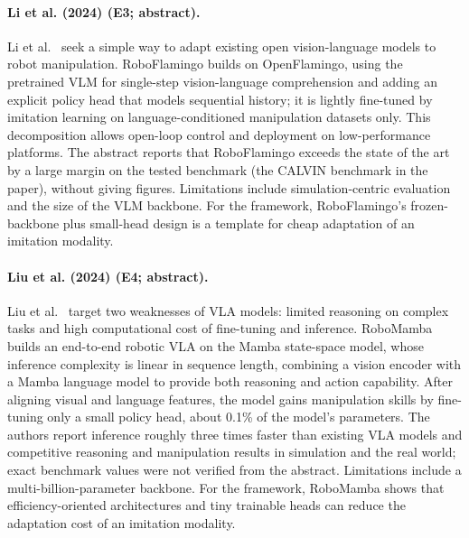 \documentclass[10pt,a4paper]{article}
\begin{document}
\paragraph{Li et al. (2024) (E3; abstract).} Li et al.~\cite{Li2024a} seek a simple way to adapt existing open vision-language models to robot manipulation. RoboFlamingo builds on OpenFlamingo, using the pretrained VLM for single-step vision-language comprehension and adding an explicit policy head that models sequential history; it is lightly fine-tuned by imitation learning on language-conditioned manipulation datasets only. This decomposition allows open-loop control and deployment on low-performance platforms. The abstract reports that RoboFlamingo exceeds the state of the art by a large margin on the tested benchmark (the CALVIN benchmark in the paper), without giving figures. Limitations include simulation-centric evaluation and the size of the VLM backbone. For the framework, RoboFlamingo's frozen-backbone plus small-head design is a template for cheap adaptation of an imitation modality.

\paragraph{Liu et al. (2024) (E4; abstract).} Liu et al.~\cite{Liu2024a} target two weaknesses of VLA models: limited reasoning on complex tasks and high computational cost of fine-tuning and inference. RoboMamba builds an end-to-end robotic VLA on the Mamba state-space model, whose inference complexity is linear in sequence length, combining a vision encoder with a Mamba language model to provide both reasoning and action capability. After aligning visual and language features, the model gains manipulation skills by fine-tuning only a small policy head, about 0.1\% of the model's parameters. The authors report inference roughly three times faster than existing VLA models and competitive reasoning and manipulation results in simulation and the real world; exact benchmark values were not verified from the abstract. Limitations include a multi-billion-parameter backbone. For the framework, RoboMamba shows that efficiency-oriented architectures and tiny trainable heads can reduce the adaptation cost of an imitation modality.
\end{document}
